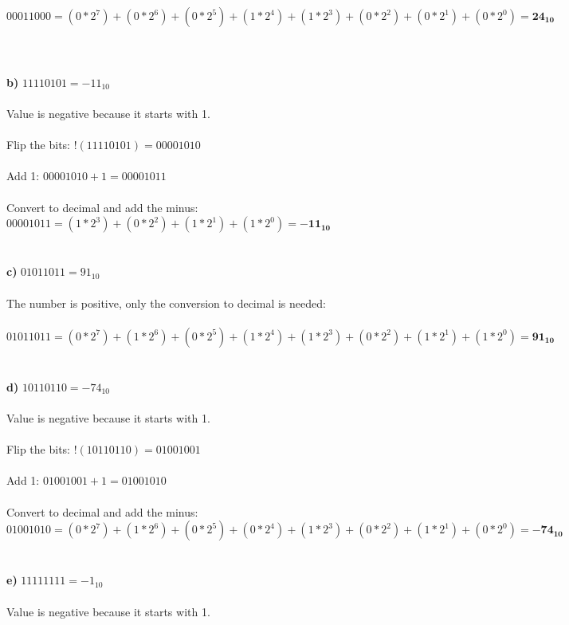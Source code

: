 \documentclass[a4paper]{article}
\begin{document}
$00011000 = (0 * 2^{7}) + (0 * 2^{6}) + (0 * 2^{5})+ (1 * 2^{4})+ (1 * 2^{3})+ (0 * 2^{2})+ (0 * 2^{1})+ (0 * 2^{0})=\mathbf{24_{10}}$\\
\\
\pagebreak
\\
\\
\textbf{b)} $11110101 = -11_{10}$\\
\\
Value is negative because it starts with 1.\\
\\
Flip the bits: $!(11110101) = 00001010$\\
\\
Add 1: $00001010 + 1 = 00001011$\\
\\
Convert to decimal and add the minus: $00001011 = (1 * 2^{3}) + (0 * 2^{2}) + (1 * 2^{1}) + (1 * 2^{0}) = \mathbf{-11_{10}}$\\
\\
\\
\textbf{c)} $01011011 = 91_{10}$\\
\\
The number is positive, only the conversion to decimal is needed:\\
\\
$01011011 = (0 * 2^{7}) + (1 * 2^{6}) + (0 * 2^{5}) + (1 * 2^{4}) + (1 * 2^{3}) + (0 * 2^{2}) + (1 * 2^{1}) + (1 * 2^{0}) = \mathbf{91_{10}}$\\
\\
\\
\textbf{d)} $10110110 = -74_{10}$\\
\\
Value is negative because it starts with 1.\\
\\
Flip the bits: $!(10110110) = 01001001$\\
\\
Add 1: $01001001 + 1 = 01001010$\\
\\
Convert to decimal and add the minus: $01001010 = (0 * 2^{7}) + (1 * 2^{6}) +(0 * 2^{5}) +(0 * 2^{4}) +(1 * 2^{3}) +(0 * 2^{2}) +(1 * 2^{1}) +(0 * 2^{0}) =\mathbf{-74_{10}}$\\
\\
\\
\textbf{e)} $11111111 = -1_{10}$\\
\\
Value is negative because it starts with 1.\\
\\
\end{document}
